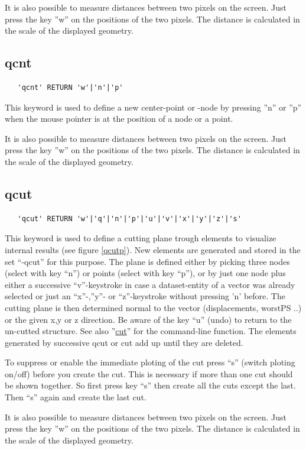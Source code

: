 \documentclass{article}
\providecommand{\htmlref}[2]{\hyperref[#2]{#1}}
\begin{document}
It is also possible to measure distances between two pixels on the screen. Just press the key ''w'' on the positions of the two pixels. The distance is calculated in the scale of the displayed geometry.

\subsection{\label{qcnt}qcnt}
\begin{verbatim}
   'qcnt' RETURN 'w'|'n'|'p' 
\end{verbatim}
This keyword is used to define a new center-point or -node by pressing ''n'' or ''p'' when the mouse pointer is at the position of a node or a point.
 
It is also possible to measure distances between two pixels on the screen. Just press the key ''w'' on the positions of the two pixels. The distance is calculated in the scale of the displayed geometry.

\subsection{\label{qcut}qcut}
\begin{verbatim}
   'qcut' RETURN 'w'|'q'|'n'|'p'|'u'|'v'|'x'|'y'|'z'|'s'
\end{verbatim}
This keyword is used to define a cutting plane trough elements to visualize internal results (see figure \ref{qcutp}). New elements are generated and stored in the set ``-qcut'' for this purpose. The plane is defined either by picking three nodes (select with key ``n'') or points (select with key ``p''), or by just one node plus either a successive ``v''-keystroke in case a dataset-entity of a vector was already selected or just an ``x''-,''y''- or ``z''-keystroke without pressing 'n' before. The cutting plane is then determined normal to the vector (displacements, worstPS ..) or the given x,y or z direction. Be aware of the key ``u'' (undo) to return to the un-cutted structure. See also ''\htmlref{cut}{cut}'' for the command-line function. The elements generated by successive qcut or cut add up until they are deleted.

To suppress or enable the immediate ploting of the cut press ``s'' (switch ploting on/off) before you create the cut. This is necessary if more than one cut should be shown together. So first press key ``s'' then create all the cuts except the last. Then ``s'' again and create the last cut.
 
It is also possible to measure distances between two pixels on the screen. Just press the key ''w'' on the positions of the two pixels. The distance is calculated in the scale of the displayed geometry.
  
\end{document}
